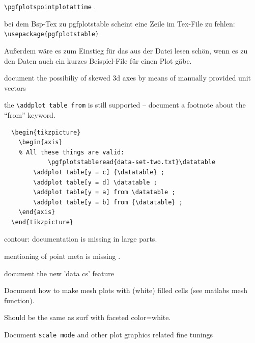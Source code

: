\documentclass[a4paper]{article}
\begin{document}
\begin{bugtracker}
\begin{doctodo}[+]
	\verb|\pgfplotspointplotattime| .
\end{doctodo}

\begin{doctodo}
	bei dem Bsp-Tex zu pgfplotstable scheint eine Zeile im Tex-File zu fehlen:
\verb|\usepackage{pgfplotstable}|

Außerdem wäre es zum Einstieg für das aus der Datei lesen schön, wenn es
zu den Daten auch ein kurzes Beispiel-File für einen Plot gäbe.
\end{doctodo}

\begin{doctodo}[+]
document the possibiliy of skewed 3d axes by means of manually provided unit vectors
\end{doctodo}


\begin{doctodo}[+]
	the \verb|\addplot table from| is still supported -- document a footnote about the ``from'' keyword.
\begin{verbatim}
  \begin{tikzpicture}
    \begin{axis}
	% All these things are valid:
            \pgfplotstableread{data-set-two.txt}\datatable
        \addplot table[y = c] {\datatable} ;
        \addplot table[y = d] \datatable ;
        \addplot table[y = a] from \datatable ;
        \addplot table[y = b] from {\datatable} ;
    \end{axis}
  \end{tikzpicture}
\end{verbatim}
\end{doctodo}

\begin{doctodo}[+]
	contour: documentation is missing in large parts.
	
	mentioning of point meta is missing .
\end{doctodo}

\begin{doctodo}[+]
	document the new 'data cs' feature
\end{doctodo}

\begin{doctodo}[+]
	Document how to make mesh plots with (white) filled cells (see matlabs mesh function).

	Should be the same as surf with faceted color=white.
\end{doctodo}

\begin{doctodo}[+]
	Document \verb|scale mode| and other plot graphics related fine tunings
\end{doctodo}


\end{bugtracker}
\end{document}
